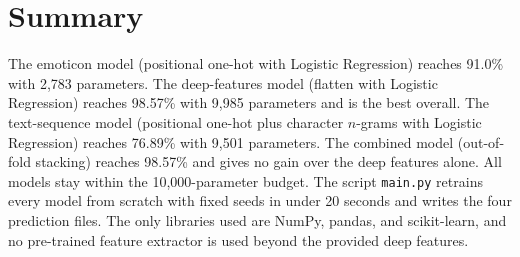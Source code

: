 \documentclass[10pt]{article}
\begin{document}
\section{Summary}
The emoticon model (positional one-hot with Logistic Regression) reaches 91.0\% with 2{,}783 parameters.
The deep-features model (flatten with Logistic Regression) reaches 98.57\% with 9{,}985 parameters and is
the best overall. The text-sequence model (positional one-hot plus character $n$-grams with Logistic
Regression) reaches 76.89\% with 9{,}501 parameters. The combined model (out-of-fold stacking) reaches
98.57\% and gives no gain over the deep features alone. All models stay within the 10{,}000-parameter
budget. The script \texttt{main.py} retrains every model from scratch with fixed seeds in under 20 seconds
and writes the four prediction files. The only libraries used are NumPy, pandas, and scikit-learn, and no
pre-trained feature extractor is used beyond the provided deep features.
\end{document}
